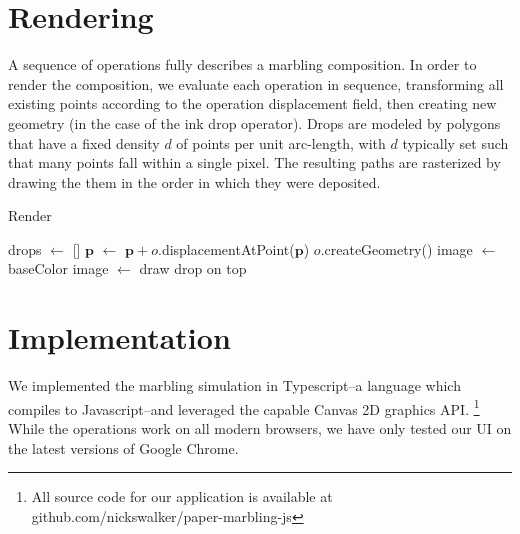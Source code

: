 \documentclass{article}
\begin{document}

\section{Rendering}

A sequence of operations fully describes a marbling composition. In order to render the composition, we evaluate each operation in sequence, transforming all existing points according to the operation displacement field, then creating new geometry (in the case of the ink drop operator). Drops are modeled by polygons that have a fixed density $d$ of points per unit arc-length, with $d$ typically set such that many points fall within a single pixel. The resulting paths are rasterized by drawing the them in the order in which they were deposited.

\begin{algorithm}
	\caption{Render}
	\label{alg:update}
	\begin{algorithmic}[1] %
		\State drops $\gets$ []
		 {}
                    \State $\bm{p}$ $\gets$ $\bm{p} + o$.displacementAtPoint($\bm{p}$)
                \EndFor
            \EndFor
            \State $o$.createGeometry()
        \EndFor
        \State image $\gets$ baseColor
            \State image $\gets$ draw drop on top
        \EndFor
		
		\EndProcedure
	\end{algorithmic}
\end{algorithm}

\section{Implementation}

We implemented the marbling simulation in Typescript--a language which compiles to Javascript--and leveraged the capable Canvas 2D graphics API. \footnote{All source code for our application is available at github.com/nickswalker/paper-marbling-js} While the operations work on all modern browsers, we have only tested our UI on the latest versions of Google Chrome.
\end{document}
